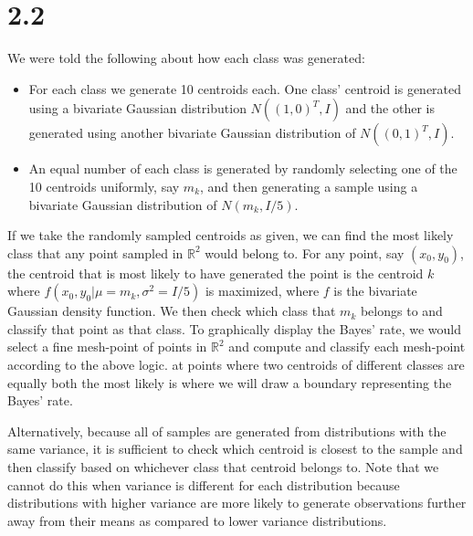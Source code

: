 \section*{2.2}

\noindent
We were told the following about how each class was generated:

\begin{itemize}
\item For each class we generate 10 centroids each. One class' centroid is 
generated using a bivariate Gaussian distribution $N((1, 0)^{T}, I)$ and the 
other is generated using another bivariate Gaussian distribution of 
$N((0, 1)^{T}, I)$.
\item An equal number of each class is generated by randomly selecting one of 
the 10 centroids uniformly, say $m_{k}$, and then generating a sample using a 
bivariate Gaussian distribution of $N(m_{k}, I / 5)$.
\end{itemize}

\noindent
If we take the randomly sampled centroids as given, we can find the most likely 
class that any point sampled in $\mathbb{R}^{2}$ would belong to. For any 
point, say $(x_{0}, y_{0})$, the centroid that is most likely to have generated 
the point is the centroid $k$ where 
$f(x_{0}, y_{0} | \mu = m_{k}, \sigma^{2} = I / 5)$ is maximized, where $f$ is 
the bivariate Gaussian density function. We then check which class that $m_{k}$ 
belongs to and classify that point as that class. To graphically display the 
Bayes' rate, we would select a fine mesh-point of points in $\mathbb{R}^{2}$ 
and compute and classify each mesh-point according to the above logic. at points 
where two centroids of different classes are equally both the most likely is 
where we will draw a boundary representing the Bayes' rate.

\vspace{5mm}
\noindent
Alternatively, because all of samples are generated from distributions with the 
same variance, it is sufficient to check which centroid is closest to the 
sample and then classify based on whichever class that centroid belongs to. 
Note that we cannot do this when variance is different for each distribution 
because distributions with higher variance are more likely to generate 
observations further away from their means as compared to lower variance 
distributions.
